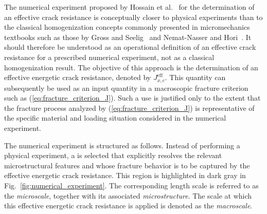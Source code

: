 \documentclass[pdflatex,sn-mathphys-num]{sn-jnl}%
\theoremstyle{thmstyleone}%
\theoremstyle{thmstyletwo}%
\theoremstyle{thmstylethree}%
\begin{document}
The numerical experiment proposed by Hossain et al.~\cite{hossain_effective_2014} for the determination of an effective crack resistance is conceptually closer to physical experiments than to the classical homogenization concepts commonly presented in micromechanics textbooks such as those by Gross and Seelig~\cite{gross_fracture_2011} and Nemat-Nasser and Hori~\cite{nemat-nasser_micromechanics_2013}. 
It should therefore be understood as an operational definition of an effective crack resistance for a prescribed numerical experiment, not as a classical homogenization result.
The objective of this approach is the determination of an effective energetic crack resistance, denoted by $J_{x,c}^{\text{eff}}$. This quantity can subsequently be used as an input quantity in a macroscopic fracture criterion such as (\ref{eq:fracture_criterion_J}).
Such a use is justified only to the extent that the fracture process analyzed by (\ref{eq:fracture_criterion_J}) is representative of the specific material and loading situation considered in the numerical experiment.

The numerical experiment is structured as follows.
Instead of performing a physical experiment, a 
 is selected that explicitly resolves the relevant microstructural features and whose fracture behavior is to be captured by the effective energetic crack resistance.
This region is highlighted in dark gray in Fig.~\ref{fig:numerical_experiment}.
The corresponding length scale is referred to as the \textsl{microscale}, together with its associated \textsl{microstructure}.
The scale at which this effective energetic crack resistance is applied is denoted as the \textsl{macroscale}.
\end{document}
